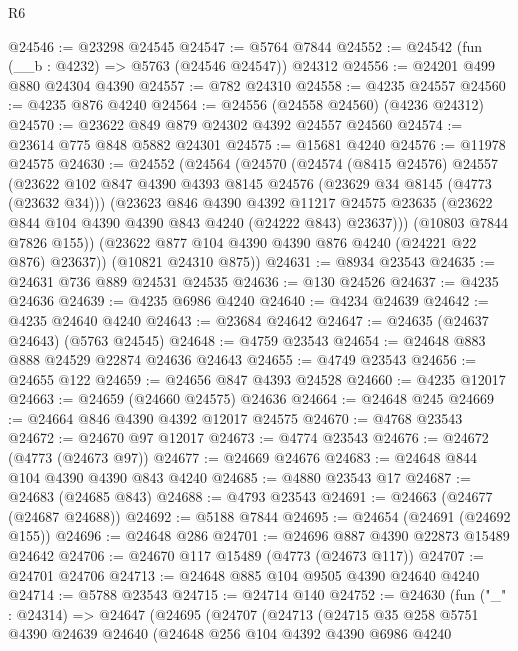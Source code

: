 \begin{lexlean}{R6}
\begin{coremodule}
@24546 := @23298 @24545
@24547 := @5764 @7844
@24552 := @24542 (fun (__b : @4232) => @5763 (@24546 @24547)) @24312
@24556 := @24201 @499 @880 @24304 @4390
@24557 := @782 @24310
@24558 := @4235 @24557
@24560 := @4235 @876 @4240
@24564 := @24556 (@24558 @24560) (@4236 @24312)
@24570 := @23622 @849 @879 @24302 @4392 @24557 @24560
@24574 := @23614 @775 @848 @5882 @24301
@24575 := @15681 @4240
@24576 := @11978 @24575
@24630 := @24552
    (@24564
      (@24570
        (@24574
          (@8415 @24576)
          @24557
          (@23622
            @102
            @847
            @4390
            @4393
            @8145
            @24576
            (@23629 @34 @8145 (@4773 (@23632 @34)))
            (@23623
              @846
              @4390
              @4392
              @11217
              @24575
              @23635
              (@23622 @844 @104 @4390 @4390 @843 @4240 (@24222 @843) @23637)))
          (@10803 @7844 @7826 @155))
        (@23622 @877 @104 @4390 @4390 @876 @4240 (@24221 @22 @876) @23637))
      (@10821 @24310 @875))
@24631 := @8934 @23543
@24635 := @24631 @736 @889 @24531 @24535
@24636 := @130 @24526
@24637 := @4235 @24636
@24639 := @4235 @6986 @4240
@24640 := @4234 @24639
@24642 := @4235 @24640 @4240
@24643 := @23684 @24642
@24647 := @24635 (@24637 @24643) (@5763 @24545)
@24648 := @4759 @23543
@24654 := @24648 @883 @888 @24529 @22874 @24636 @24643
@24655 := @4749 @23543
@24656 := @24655 @122
@24659 := @24656 @847 @4393 @24528
@24660 := @4235 @12017
@24663 := @24659 (@24660 @24575) @24636
@24664 := @24648 @245
@24669 := @24664 @846 @4390 @4392 @12017 @24575
@24670 := @4768 @23543
@24672 := @24670 @97 @12017
@24673 := @4774 @23543
@24676 := @24672 (@4773 (@24673 @97))
@24677 := @24669 @24676
@24683 := @24648 @844 @104 @4390 @4390 @843 @4240
@24685 := @4880 @23543 @17
@24687 := @24683 (@24685 @843)
@24688 := @4793 @23543
@24691 := @24663 (@24677 (@24687 @24688))
@24692 := @5188 @7844
@24695 := @24654 (@24691 (@24692 @155))
@24696 := @24648 @286
@24701 := @24696 @887 @4390 @22873 @15489 @24642
@24706 := @24670 @117 @15489 (@4773 (@24673 @117))
@24707 := @24701 @24706
@24713 := @24648 @885 @104 @9505 @4390 @24640 @4240
@24714 := @5788 @23543
@24715 := @24714 @140
@24752 := @24630
    (fun ("_" : @24314) =>
    @24647
      (@24695
        (@24707
          (@24713
            (@24715
              @35
              @258
              @5751
              @4390
              @24639
              @24640
              (@24648
                @256
                @104
                @4392
                @4390
                @6986
                @4240

\end{coremodule}
\end{lexlean}
